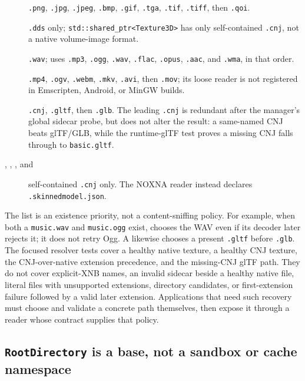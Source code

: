 \begin{description}
\item[] \texttt{.png}, \texttt{.jpg}, \texttt{.jpeg}, \texttt{.bmp},
\texttt{.gif}, \texttt{.tga}, \texttt{.tif}, \texttt{.tiff}, then \texttt{.qoi}.
\item[] \texttt{.dds} only; \texttt{std::shared\_ptr<Texture3D>} has
only self-contained \texttt{.cnj}, not a native volume-image format.
\item[] \texttt{.wav};  uses \texttt{.mp3},
\texttt{.ogg}, \texttt{.wav}, \texttt{.flac}, \texttt{.opus}, \texttt{.aac}, and
\texttt{.wma}, in that order.
\item[] \texttt{.mp4}, \texttt{.ogv}, \texttt{.webm}, \texttt{.mkv},
\texttt{.avi}, then \texttt{.mov}; its loose reader is not registered in Emscripten, Android,
or MinGW builds.
\item[] \texttt{.cnj}, \texttt{.gltf}, then \texttt{.glb}. The leading
\texttt{.cnj} is redundant after the manager's global sidecar probe, but does not alter the
result: a same-named CNJ beats glTF/GLB, while the runtime-glTF test proves a missing CNJ falls
through to \texttt{basic.gltf}.
\item[, , , and
] self-contained \texttt{.cnj} only. The NOXNA
 reader instead declares \texttt{.skinnedmodel.json}.
\end{description}

The list is an existence priority, not a content-sniffing policy. For example, when both a
\texttt{music.wav} and \texttt{music.ogg} exist,  chooses the WAV even if its
decoder later rejects it; it does not retry Ogg. A  likewise chooses a present
\texttt{.gltf} before \texttt{.glb}. The focused resolver tests cover a healthy native texture,
a healthy CNJ texture, the CNJ-over-native extension precedence, and the missing-CNJ glTF path.
They do not cover explicit-XNB names, an invalid sidecar beside a healthy native file, literal
files with unsupported extensions, directory candidates, or first-extension failure followed by
a valid later extension. Applications that need such recovery must choose and validate a concrete
path themselves, then expose it through a reader whose contract supplies that policy.

\subsection{\texttt{RootDirectory} is a base, not a sandbox or cache namespace}

